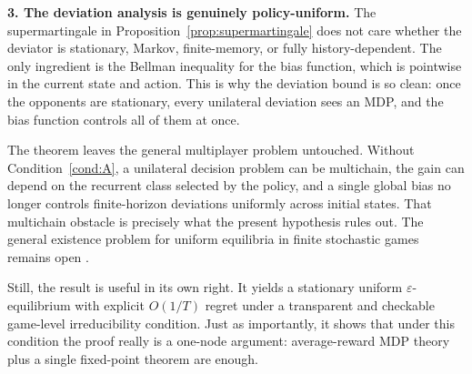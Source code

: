 \documentclass[11pt]{article}
\theoremstyle{definition}
\newcommand{\1}{\mathbf{1}}
\begin{document}
\medskip
\noindent
\textbf{3. The deviation analysis is genuinely policy-uniform.}
The supermartingale in Proposition~\ref{prop:supermartingale} does not care whether the deviator is stationary, Markov, finite-memory, or fully history-dependent. The only ingredient is the Bellman inequality for the bias function, which is pointwise in the current state and action. This is why the deviation bound is so clean: once the opponents are stationary, every unilateral deviation sees an MDP, and the bias function controls all of them at once.

The theorem leaves the general multiplayer problem untouched. Without Condition~\ref{cond:A}, a unilateral decision problem can be multichain, the gain can depend on the recurrent class selected by the policy, and a single global bias no longer controls finite-horizon deviations uniformly across initial states. That multichain obstacle is precisely what the present hypothesis rules out. The general existence problem for uniform equilibria in finite stochastic games remains open \cite{SolanVieille2015,Solan2022,OpenProblems2026}.

Still, the result is useful in its own right. It yields a stationary uniform $\varepsilon$-equilibrium with explicit $O(1/T)$ regret under a transparent and checkable game-level irreducibility condition. Just as importantly, it shows that under this condition the proof really is a one-node argument: average-reward MDP theory plus a single fixed-point theorem are enough.
\end{document}

